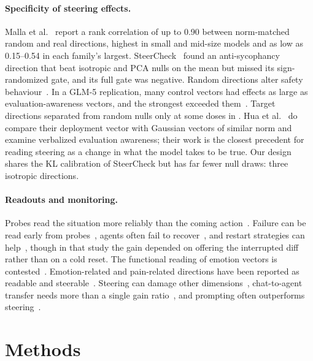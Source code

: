 \documentclass[11pt]{article}
\begin{document}
\paragraph{Specificity of steering effects.} Malla et al.~\cite{malla2026interference} report a rank correlation of up to 0.90 between norm-matched random and real directions, highest in small and mid-size models and as low as 0.15--0.54 in each family's largest. SteerCheck~\cite{luo2026steercheck} found an anti-sycophancy direction that beat isotropic and PCA nulls on the mean but missed its sign-randomized gate, and its full gate was negative. Random directions alter safety behaviour~\cite{korznikov2026rogue}. In a GLM-5 replication, many control vectors had effects as large as evaluation-awareness vectors, and the strongest exceeded them~\cite{read2026reproducing}. Target directions separated from random nulls only at some doses in \cite{mitrani2026alignment}. Hua et al.~\cite{hua2026steering} do compare their deployment vector with Gaussian vectors of similar norm and examine verbalized evaluation awareness; their work is the closest precedent for reading steering as a change in what the model takes to be true. Our design shares the KL calibration of SteerCheck but has far fewer null draws: three isotropic directions.

\paragraph{Readouts and monitoring.} Probes read the situation more reliably than the coming action~\cite{fomin2026probes}. Failure can be read early from probes~\cite{chen2026goaldrift,ruan2026doomed}, agents often fail to recover~\cite{rahman2026locating}, and restart strategies can help~\cite{wang2026failfast}, though in that study the gain depended on offering the interrupted diff rather than on a cold reset. The functional reading of emotion vectors is contested~\cite{peiris2026functional,goldenberg2026emotions}. Emotion-related and pain-related directions have been reported as readable and steerable~\cite{sun2026valence,tagliabue2026pain}. Steering can damage other dimensions~\cite{jayabahu2026halt}, chat-to-agent transfer needs more than a single gain ratio~\cite{pinto2026transfer}, and prompting often outperforms steering~\cite{xu2026controllable,sprejer2026gap}.

\section{Methods}
\end{document}
